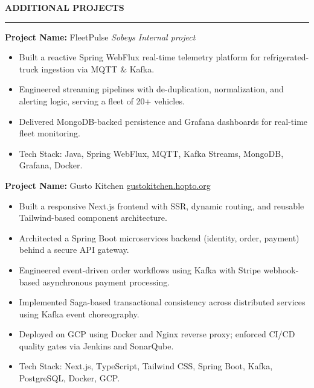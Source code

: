 \documentclass[9pt,letterpaper]{article}
\newlength{\sectionrulegap}
\newlength{\sectioncontentgap}
\newcommand{\resumesection}[1]{%
  \par\vspace{\sectionrulegap}%
  \noindent\textbf{\MakeUppercase{#1}}\par
  \nointerlineskip
  \vspace{\sectionrulegap}%
  \noindent\rule{\linewidth}{0.35pt}\par
  \nointerlineskip
  \vspace{\sectionrulegap}%
}
\begin{document}
\resumesection{Additional Projects}
\textbf{Project Name:} FleetPulse \hfill \textit{Sobeys Internal project}\\
\begin{itemize}
  \item Built a reactive Spring WebFlux real-time telemetry platform for refrigerated-truck ingestion via MQTT \& Kafka.
  \item Engineered streaming pipelines with de-duplication, normalization, and alerting logic, serving a fleet of 20+ vehicles.
  \item Delivered MongoDB-backed persistence and Grafana dashboards for real-time fleet monitoring.
  \item Tech Stack: Java, Spring WebFlux, MQTT, Kafka Streams, MongoDB, Grafana, Docker.
\end{itemize}
\vspace{\sectioncontentgap}
\textbf{Project Name:} Gusto Kitchen \hfill \underline{\href{https://gustokitchen.hopto.org/}{gustokitchen.hopto.org}}\\
\begin{itemize}
  \item Built a responsive Next.js frontend with SSR, dynamic routing, and reusable Tailwind-based component architecture.
  \item Architected a Spring Boot microservices backend (identity, order, payment) behind a secure API gateway.
  \item Engineered event-driven order workflows using Kafka with Stripe webhook-based asynchronous payment processing.
  \item Implemented Saga-based transactional consistency across distributed services using Kafka event choreography.
  \item Deployed on GCP using Docker and Nginx reverse proxy; enforced CI/CD quality gates via Jenkins and SonarQube.
  \item Tech Stack: Next.js, TypeScript, Tailwind CSS, Spring Boot, Kafka, PostgreSQL, Docker, GCP.
\end{itemize}
\vspace{\sectioncontentgap}
\end{document}
